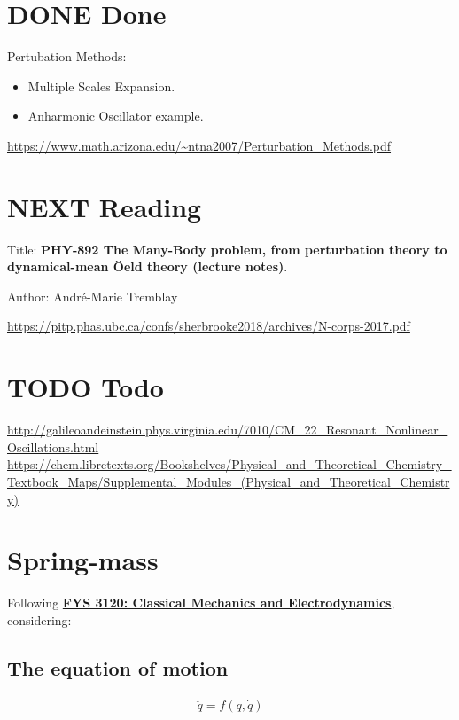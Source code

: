 \documentclass[12pt]{article}
\author{Pedro Branquinho}
\date{\today}
\title{}
\begin{document}
\tableofcontents


\section{{\bfseries\sffamily DONE} Done}
\label{sec:orgce7d909}
Pertubation Methods:
\begin{itemize}
\item Multiple Scales Expansion.
\item Anharmonic Oscillator example.
\end{itemize}
\url{https://www.math.arizona.edu/\~ntna2007/Perturbation\_Methods.pdf}

\section{NEXT Reading}
\label{sec:orge42d7ba}
Title: \textbf{PHY-892 The Many-Body problem, from
perturbation theory to dynamical-mean Öeld
theory (lecture notes)}.

Author: André-Marie Tremblay

\url{https://pitp.phas.ubc.ca/confs/sherbrooke2018/archives/N-corps-2017.pdf}

\section{{\bfseries\sffamily TODO} Todo}
\label{sec:orgfb48cac}
\url{http://galileoandeinstein.phys.virginia.edu/7010/CM\_22\_Resonant\_Nonlinear\_Oscillations.html}
\url{https://chem.libretexts.org/Bookshelves/Physical\_and\_Theoretical\_Chemistry\_Textbook\_Maps/Supplemental\_Modules\_(Physical\_and\_Theoretical\_Chemistry)}

\section{Spring-mass}
\label{sec:orgcc7162a}

Following \textbf{\href{https://www.uio.no/studier/emner/matnat/fys/FYS3120/v14/undervisningsmateriale/smalloscillations.pdf}{FYS 3120: Classical Mechanics and Electrodynamics}}, considering:
\subsection{The equation of motion}
\label{sec:org8302932}
\begin{equation}
\begin{aligned}
\ddot{q} = f(q, \dot{q})
\end{aligned}
\end{equation}
\end{document}
